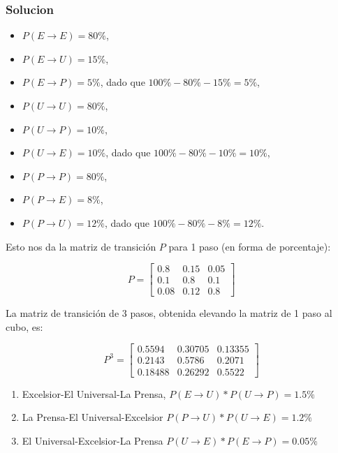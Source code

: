 \documentclass{article}
\begin{document}
\subsubsection*{Solucion}

\begin{itemize}
    \item $P(E \rightarrow E) = 80\%$,
    \item $P(E \rightarrow U) = 15\%$,
    \item $P(E \rightarrow P) = 5\%$, dado que $100\% - 80\% - 15\% = 5\%$,
    \item $P(U \rightarrow U) = 80\%$,
    \item $P(U \rightarrow P) = 10\%$,
    \item $P(U \rightarrow E) = 10\%$, dado que $100\% - 80\% - 10\% = 10\%$,
    \item $P(P \rightarrow P) = 80\%$,
    \item $P(P \rightarrow E) = 8\%$,
    \item $P(P \rightarrow U) = 12\%$, dado que $100\% - 80\% - 8\% = 12\%$.
\end{itemize}

Esto nos da la matriz de transición \(P\) para 1 paso (en forma de porcentaje):

\[ P = \begin{bmatrix} 0.8 & 0.15 & 0.05 \\ 0.1 & 0.8 & 0.1 \\ 0.08 & 0.12 & 0.8 \end{bmatrix} \]

La matriz de transición de 3 pasos, obtenida elevando la matriz de 1 paso al cubo, es:

\[ P^3 = \begin{bmatrix} 0.5594 & 0.30705 & 0.13355 \\ 0.2143 & 0.5786 & 0.2071 \\ 0.18488 & 0.26292 & 0.5522 \end{bmatrix} \]

\begin{enumerate}
    \item Excelsior-El Universal-La Prensa, $P(E \rightarrow U) * P(U \rightarrow P) = 1.5\%$
    \item La Prensa-El Universal-Excelsior $P(P \rightarrow U) * P(U \rightarrow E) = 1.2\%$
    \item El Universal-Excelsior-La Prensa $P(U \rightarrow E) * P(E \rightarrow P) = 0.05\%$
\end{enumerate}
\end{document}
